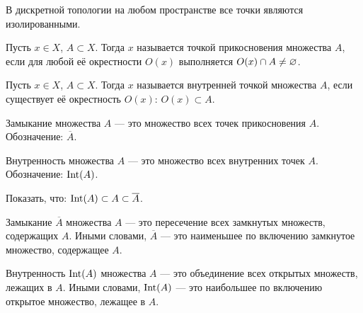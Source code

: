 \begin{nota_bene}
    В дискретной топологии на любом пространстве все точки являются изолированными.
\end{nota_bene}

\begin{definition}
    Пусть $x \in X$, $A \subset X$. Тогда $x$ называется точкой прикосновения множества $A$, если для любой её окрестности $O(x)$ выполняется $O(x) \cap A \neq \varnothing$. 
\end{definition}

\begin{definition}
    Пусть $x \in X$, $A \subset X$. Тогда $x$ называется внутренней точкой множества $A$, если существует её окрестность $O(x)$: $O(x) \subset A$.
\end{definition}

\begin{definition}[A1]
    Замыкание множества $A$ --- это множество всех точек прикосновения $A$.
    Обозначение: $\overline{A}$.
\end{definition}

\begin{definition}[B1]
    Внутренность множества $A$ --- это множество всех внутренних точек $A$.
    Обозначение: $\operatorname{Int}(A)$.
\end{definition}

\begin{exercise}
    Показать, что: $\operatorname{Int}(A) \subset A \subset \overline{A}$.
\end{exercise}

\begin{definition}[A2]
    Замыкание $\overline{A}$ множества $A$ --- это пересечение всех замкнутых множеств, содержащих $A$. Иными словами,
    $\overline{A}$ --- это наименьшее по включению замкнутое множество, содержащее $A$.

\end{definition}

\begin{definition}[B2]
    Внутренность $\operatorname{Int}(A)$ множества $A$ --- это объединение всех открытых множеств, лежащих в $A$. Иными словами,
    $\operatorname{Int}(A)$ --- это наибольшее по включению открытое множество, лежащее в $A$.
\end{definition}

